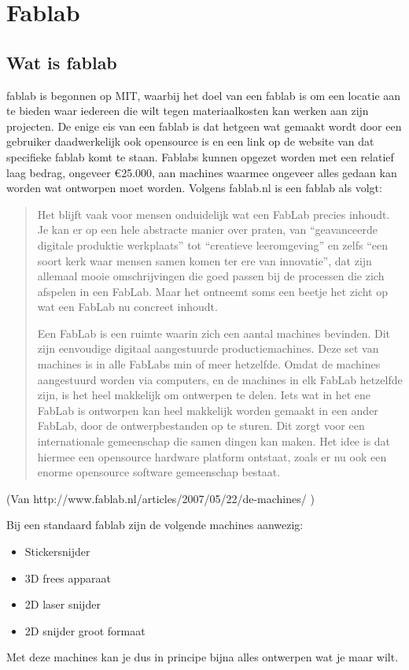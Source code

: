 \chapter{Fablab}
\section{Wat is fablab}
fablab is begonnen op MIT, waarbij het doel van een fablab is om een locatie aan te bieden waar iedereen die wilt tegen materiaalkosten kan werken aan zijn projecten. De enige eis van een fablab is dat hetgeen wat gemaakt wordt door een gebruiker daadwerkelijk ook opensource is en een link op de website van dat specifieke fablab komt te staan. 
Fablabs kunnen opgezet worden met een relatief laag bedrag, ongeveer €25.000, aan machines waarmee ongeveer alles gedaan kan worden wat ontworpen moet worden. 
Volgens fablab.nl is een fablab als volgt:
\begin{quote}
Het blijft vaak voor mensen onduidelijk wat een FabLab precies inhoudt. Je kan er op een hele abstracte manier over praten, van “geavanceerde digitale produktie werkplaats” tot “creatieve leeromgeving” en zelfs “een soort kerk waar mensen samen komen ter ere van innovatie”, dat zijn allemaal mooie omschrijvingen die goed passen bij de processen die zich afspelen in een FabLab. Maar het ontneemt soms een beetje het zicht op wat een FabLab nu concreet inhoudt.


Een FabLab is een ruimte waarin zich een aantal machines bevinden. Dit zijn eenvoudige digitaal aangestuurde productiemachines. Deze set van machines is in alle FabLabs min of meer hetzelfde. Omdat de machines aangestuurd worden via computers, en de machines in elk FabLab hetzelfde zijn, is het heel makkelijk om ontwerpen te delen. Iets wat in het ene FabLab is ontworpen kan heel makkelijk worden gemaakt in een ander FabLab, door de ontwerpbestanden op te sturen. Dit zorgt voor een internationale gemeenschap die samen dingen kan maken. Het idee is dat hiermee een opensource hardware platform ontstaat, zoals er nu ook een enorme opensource software gemeenschap bestaat.
\end{quote}(Van http://www.fablab.nl/articles/2007/05/22/de-machines/ )

Bij een standaard fablab zijn de volgende machines aanwezig:
\begin{itemize}
  \item Stickersnijder
  \item 3D frees apparaat
  \item 2D laser snijder
  \item 2D snijder groot formaat
\end{itemize}
Met deze machines kan je dus in principe bijna alles ontwerpen wat je maar wilt.
